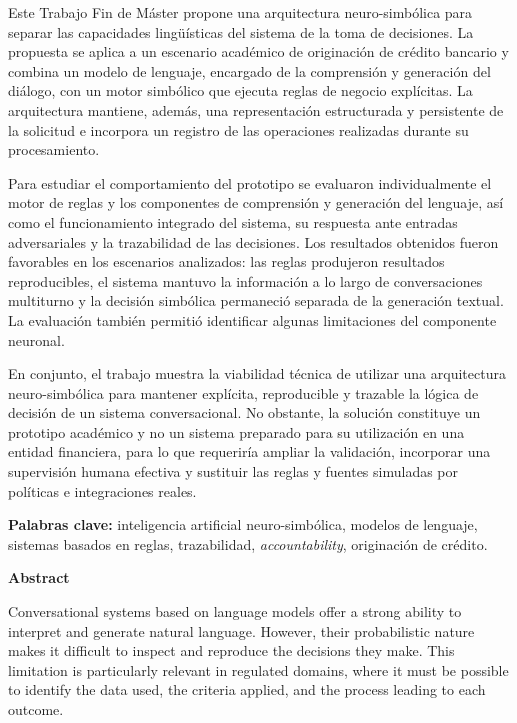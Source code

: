 \documentclass[12pt,a4paper]{report}
\begin{document}
Este Trabajo Fin de Máster propone una arquitectura neuro-simbólica para separar las capacidades lingüísticas del sistema de la toma de decisiones. La propuesta se aplica a un escenario académico de originación de crédito bancario y combina un modelo de lenguaje, encargado de la comprensión y generación del diálogo, con un motor simbólico que ejecuta reglas de negocio explícitas. La arquitectura mantiene, además, una representación estructurada y persistente de la solicitud e incorpora un registro de las operaciones realizadas durante su procesamiento. 

Para estudiar el comportamiento del prototipo se evaluaron individualmente el motor de reglas y los componentes de comprensión y generación del lenguaje, así como el funcionamiento integrado del sistema, su respuesta ante entradas adversariales y la trazabilidad de las decisiones. Los resultados obtenidos fueron favorables en los escenarios analizados: las reglas produjeron resultados reproducibles, el sistema mantuvo la información a lo largo de conversaciones multiturno y la decisión simbólica permaneció separada de la generación textual. La evaluación también permitió identificar algunas limitaciones del componente neuronal.

En conjunto, el trabajo muestra la viabilidad técnica de utilizar una arquitectura neuro-simbólica para mantener explícita, reproducible y trazable la lógica de decisión de un sistema conversacional. No obstante, la solución constituye un prototipo académico y no un sistema preparado para su utilización en una entidad financiera, para lo que requeriría ampliar la validación, incorporar una supervisión humana efectiva y sustituir las reglas y fuentes simuladas por políticas e integraciones reales.

\vspace{0.5cm}

\noindent\textbf{Palabras clave:} inteligencia artificial neuro-simbólica, modelos de lenguaje, sistemas basados en reglas, trazabilidad, \textit{accountability}, originación de crédito.

\newpage

\thispagestyle{plain}
\begin{center}
    {\Large \textbf{Abstract}}
\end{center}
\vspace{0.5cm}

\noindent
Conversational systems based on language models offer a strong ability to interpret and generate natural language. However, their probabilistic nature makes it difficult to inspect and reproduce the decisions they make. This limitation is particularly relevant in regulated domains, where it must be possible to identify the data used, the criteria applied, and the process leading to each outcome.
\end{document}
